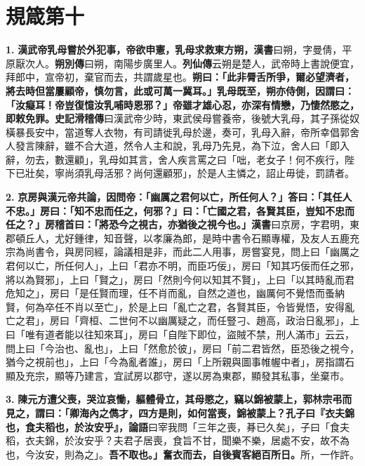 \chapter{規箴第十}

\textbf{1.} \textbf{漢武帝乳母嘗於外犯事，帝欲申憲，乳母求救東方朔，}{\footnotesize \textbf{漢書}曰朔，字曼倩，平原厭次人。\textbf{朔別傳}曰朔，南陽步廣里人。\textbf{列仙傳}云朔是楚人，武帝時上書說便宜，拜郎中，宣帝初，棄官而去，共謂歲星也。}\textbf{朔曰：「此非脣舌所爭，爾必望濟者，將去時但當屢顧帝，慎勿言，此或可萬一冀耳。」乳母既至，朔亦侍側，因謂曰：「汝癡耳！帝豈復憶汝乳哺時恩邪？」帝雖才雄心忍，亦深有情戀，乃悽然愍之，即敕免罪。}{\footnotesize \textbf{史記滑稽傳}曰漢武帝少時，東武侯母嘗養帝，後號大乳母，其子孫從奴橫暴長安中，當道奪人衣物，有司請徙乳母於邊，奏可，乳母入辭，帝所幸倡郭舍人發言陳辭，雖不合大道，然令人主和說，乳母乃先見，為下泣，舍人曰「即入辭，勿去，數還顧」，乳母如其言，舍人疾言罵之曰「咄，老女子！何不疾行，陛下已壯矣，寧尚須乳母活邪？尚何還顧邪」，於是人主憐之，詔止毋徙，罰請者。}

\textbf{2.} \textbf{京房與漢元帝共論，因問帝：「幽厲之君何以亡，所任何人？」答曰：「其任人不忠。」房曰：「知不忠而任之，何邪？」曰：「亡國之君，各賢其臣，豈知不忠而任之？」房稽首曰：「將恐今之視古，亦猶後之視今也。」}{\footnotesize \textbf{漢書}曰京房，字君明，東郡頓丘人，尤好鍾律，知音聲，以孝廉為郎，是時中書令石顯專權，及友人五鹿充宗為尚書令，與房同經，論議相是非，而此二人用事，房嘗宴見，問上曰「幽厲之君何以亡，所任何人」，上曰「君亦不明，而臣巧佞」，房曰「知其巧佞而任之邪，將以為賢邪」，上曰「賢之」，房曰「然則今何以知其不賢」，上曰「以其時亂而君危知之」，房曰「是任賢而理，任不肖而亂，自然之道也，幽厲何不覺悟而蚤納賢，何為卒任不肖以至亡」，於是上曰「亂亡之君，各賢其臣，令皆覺悟，安得亂亡之君」，房曰「齊桓、二世何不以幽厲疑之，而任豎刁、趙高，政治日亂邪」，上曰「唯有道者能以往知來耳」，房曰「自陛下即位，盜賊不禁，刑人滿市」云云，問上曰「今治也、亂也」，上曰「然愈於彼」，房曰「前二君皆然，臣恐後之視今，猶今之視前也」，上曰「今為亂者誰」，房曰「上所親與圖事帷幄中者」，房指謂石顯及充宗，顯等乃建言，宜試房以郡守，遂以房為東郡，顯發其私事，坐棄市。}

\textbf{3.} \textbf{陳元方遭父喪，哭泣哀慟，軀體骨立，其母愍之，竊以錦被蒙上，郭林宗弔而見之，謂曰：「卿海內之儁才，四方是則，如何當喪，錦被蒙上？孔子曰『衣夫錦也，食夫稻也，於汝安乎』，}{\footnotesize \textbf{論語}曰宰我問「三年之喪，朞已久矣」，子曰「食夫稻，衣夫錦，於汝安乎？夫君子居喪，食旨不甘，聞樂不樂，居處不安，故不為也，今汝安，則為之」。}\textbf{吾不取也。」奮衣而去，自後賓客絕百所日。}{\footnotesize 所，一作許。}

